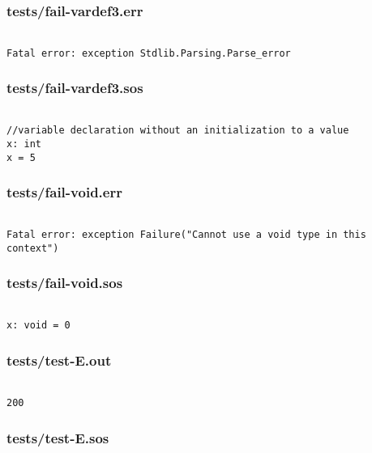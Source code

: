 \documentclass[main.tex]{subfiles}
\begin{document}
\subsubsection{tests/fail-vardef3.err}

\begin{lstlisting}

Fatal error: exception Stdlib.Parsing.Parse_error
\end{lstlisting}

\subsubsection{tests/fail-vardef3.sos}

\begin{lstlisting}

//variable declaration without an initialization to a value
x: int
x = 5
\end{lstlisting}

\subsubsection{tests/fail-void.err}

\begin{lstlisting}

Fatal error: exception Failure("Cannot use a void type in this context")
\end{lstlisting}

\subsubsection{tests/fail-void.sos}

\begin{lstlisting}

x: void = 0
\end{lstlisting}

\subsubsection{tests/test-E.out}

\begin{lstlisting}

200
\end{lstlisting}

\subsubsection{tests/test-E.sos}
\end{document}
